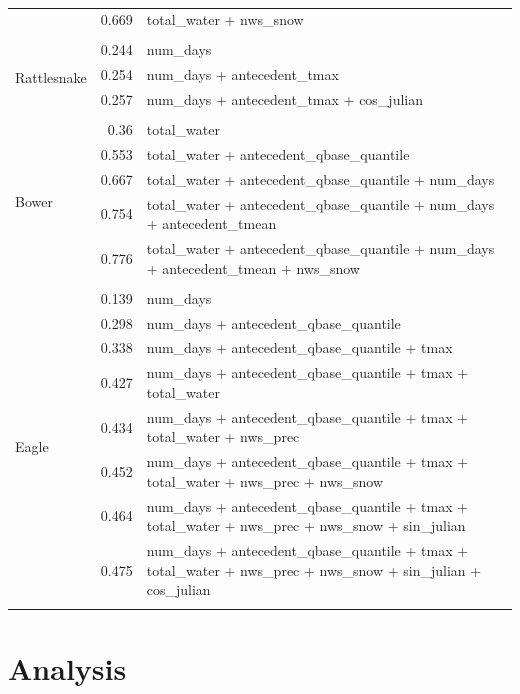 \documentclass[10pt]{article}
\begin{document}
\begin{table}[h]
\begin{center}
\begin{tabular}{lrl}
 & 0.669 & total\_water + nws\_snow\\ 
\vspace{2mm}\\ \multirow{4}{*}{Rattlesnake} & 0.244 & num\_days\\ 
 & 0.254 & num\_days + antecedent\_tmax\\ 
 & 0.257 & num\_days + antecedent\_tmax + cos\_julian\\ 
\vspace{2mm}\\ \multirow{6}{*}{Bower} & 0.36 & total\_water\\ 
 & 0.553 & total\_water + antecedent\_qbase\_quantile\\ 
 & 0.667 & total\_water + antecedent\_qbase\_quantile + num\_days\\ 
 & 0.754 & total\_water + antecedent\_qbase\_quantile + num\_days + antecedent\_tmean\\ 
 & 0.776 & total\_water + antecedent\_qbase\_quantile + num\_days + antecedent\_tmean + nws\_snow\\ 
\vspace{2mm}\\ \multirow{9}{*}{Eagle} & 0.139 & num\_days\\ 
 & 0.298 & num\_days + antecedent\_qbase\_quantile\\ 
 & 0.338 & num\_days + antecedent\_qbase\_quantile + tmax\\ 
 & 0.427 & num\_days + antecedent\_qbase\_quantile + tmax + total\_water\\ 
 & 0.434 & num\_days + antecedent\_qbase\_quantile + tmax + total\_water + nws\_prec\\ 
 & 0.452 & num\_days + antecedent\_qbase\_quantile + tmax + total\_water + nws\_prec + nws\_snow\\ 
 & 0.464 & num\_days + antecedent\_qbase\_quantile + tmax + total\_water + nws\_prec + nws\_snow + sin\_julian\\ 
 & 0.475 & num\_days + antecedent\_qbase\_quantile + tmax + total\_water + nws\_prec + nws\_snow + sin\_julian + cos\_julian\\ 
\vspace{2mm}\\     \end{tabular}
    \caption{\label{phos_r_square_nosnow}}
    \end{center}
\end{table}


\section{Analysis}
\end{document}
